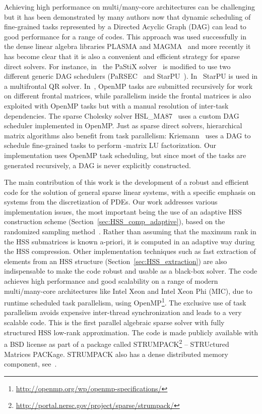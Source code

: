 \documentclass{article}
\newcommand{\tm}{\textsuperscript{\textregistered}}
\begin{document}
Achieving high performance on multi/many-core architectures can be
challenging but it has been demonstrated by many authors now that
dynamic scheduling of fine-grained tasks represented by a Directed
Acyclic Graph (DAG) can lead to good performance for a range of codes.
This approach was used successfully in the dense linear algebra
libraries PLASMA and MAGMA~\cite{agullo2009numerical} and more
recently it has become clear that it is also a convenient and
efficient strategy for sparse direct solvers. For instance,
in~\cite{lacoste2014taking} the PaStiX solver~\cite{henon2002pastix}
is modified to use two different generic DAG schedulers
(PaRSEC~\cite{bosilca2012dague} and
StarPU~\cite{augonnet2011starpu}). In~\cite{agullo2013multifrontal}
StarPU is used in a multifrontal QR solver.
In~\cite{kim2014parallel}, OpenMP tasks are submitted recursively for
work on different frontal matrices, while parallelism inside the
frontal matrices is also exploited with OpenMP tasks but with a manual
resolution of inter-task dependencies. The sparse Cholesky solver
HSL\_MA87~\cite{hogg2010design} uses a custom DAG scheduler
implemented in OpenMP. Just as sparse direct solvers, hierarchical
matrix algorithms also benefit from task parallelism:
Kriemann~\cite{kriemann2013} uses a DAG to schedule fine-grained tasks
to perform -matrix LU factorization. Our implementation
uses OpenMP task scheduling, but since most of the tasks are generated
recursively, a DAG is never explicitly constructed.

The main contribution of this work is the development of a robust and
efficient code for the solution of general sparse linear systems, with
a specific emphasis on systems from the discretization of PDEs.
Our work addresses various implementation issues, the most important
being the use of an adaptive HSS construction scheme
(Section~\ref{sec:HSS_comp_adaptive}), based on the randomized
sampling method~\cite{martinsson2011fast}.  Rather than assuming that
the maximum rank in the HSS submatrices is known a-priori, it is
computed in an adaptive way during the HSS compression. Other
implementation techniques such as fast extraction of elements from an
HSS structure (Section~\ref{sec:HSS_extraction}) are also
indispensable to make the code robust and usable as a black-box
solver.  The code achieves high performance and good scalability on a
range of modern multi/many-core architectures like Intel\tm{} Xeon and
Intel\tm{} Xeon Phi (MIC), due to runtime scheduled task parallelism,
using
OpenMP\footnote{\url{http://openmp.org/wp/openmp-specifications/}}.
The exclusive use of task parallelism avoids expensive inter-thread
synchronization and leads to a very scalable code.  This is the first
parallel algebraic sparse solver with fully structured HSS low-rank
approximation. The code is made publicly available with a BSD license
as part of a package called
STRUMPACK\footnote{\url{http://portal.nersc.gov/project/sparse/strumpack/}}
-- STRUctured Matrices PACKage. STRUMPACK also has a dense distributed
memory component, see~\cite{FHR}.
\end{document}
